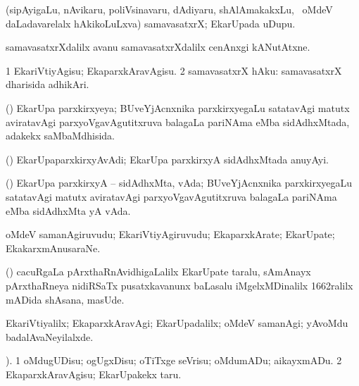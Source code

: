 \bentry
{} 
\gl{\nA}
\expl{}
\bmng
(sipAyigaLu, nAvikaru, poliVsinavaru, dAdiyaru, shAlAmakakxLu, \mo\ oMdeV daLadavarelalx hAkikoLuLxva) samavasatxrX; EkarUpada uDupu. 
\emng

\noindent
\gl{\pagu}
\expl{}
\bmng
{} samavasatxrXdalilx  avanu samavasatxrXdalilx cenAnxgi kANutAtxne. 
\emng
\eentry

\bentry
{} 
\gl{\sakirx}
\expl{}
\bmng
\bnum
\num{1} EkariVtiyAgisu; EkaparxkAravAgisu. 
\num{2} samavasatxrX hAku:  samavasatxrX dharisida adhikAri. 
\enum
\emng
\eentry

\bentry
{} 
\gl{\gu}
\expl{}
\bmng
(\BUvi) EkarUpa parxkirxyeya; BUveYjAcnxnika parxkirxyegaLu satatavAgi matutx aviratavAgi parxyoVgavAgutitxruva balagaLa pariNAma eMba sidAdhxMtada, adakekx saMbaMdhisida. 
\emng
\eentry

\bentry
{} 
\gl{\nA}
\expl{}
\bmng
(\BUvi) EkarUpaparxkirxyAvAdi; EkarUpa parxkirxyA sidAdhxMtada anuyAyi. 
\emng
\eentry

\bentry
{} 
\gl{\nA}
\expl{}
\bmng
(\BUvi) EkarUpa parxkirxyA -- sidAdhxMta, vAda; BUveYjAcnxnika parxkirxyegaLu satatavAgi matutx aviratavAgi parxyoVgavAgutitxruva balagaLa pariNAma eMba sidAdhxMta yA vAda. 
\emng
\eentry

\bentry
{} 
\gl{\nA}
\bmng
oMdeV samanAgiruvudu; EkariVtiyAgiruvudu; EkaparxkArate; EkarUpate; EkakarxmAnusaraNe. 
\emng

\noindent
\gl{\pagu}
\expl{}
\bmng
{} (\ca) cacuRgaLa pArxthaRnAvidhigaLalilx EkarUpate taralu, sAmAnayx pArxthaRneya nidiRSaTx pusatxkavanunx baLasalu iMgelxMDinalilx 1662ralilx mADida shAsana, masUde. 
\emng
\eentry

\bentry
{} 
\gl{\kirxvi}
\expl{}
\bmng
EkariVtiyalilx; EkaparxkAravAgi; EkarUpadalilx; oMdeV samanAgi; yAvoMdu badalAvaNeyilalxde. 
\emng
\eentry

\bentry
{} 
\gl{\akirx}
).  \bmng
\bnum
\num{1} oMdugUDisu; ogUgxDisu; oTiTxge seVrisu; oMdumADu; aikayxmADu. 
\num{2} EkaparxkAravAgisu; EkarUpakekx taru. 
\enum
\emng
\eentry

